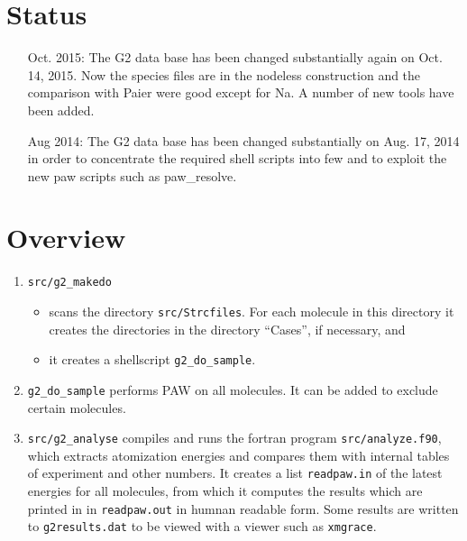 \documentclass{book}
\begin{document}
\section*{Status}
\begin{itemize}
\item[Oct. 2015:] The G2 data base has been changed substantially
  again on Oct. 14, 2015. Now the species files are in the nodeless
  construction and the comparison with Paier were good except for
  Na. A number of new tools have been added.
%
\item[Aug 2014:] The G2 data base has been changed substantially on
  Aug. 17, 2014 in order to concentrate the required shell scripts
  into few and to exploit the new paw scripts such as paw\_resolve.
%
\end{itemize}

\section*{Overview}
\begin{enumerate}
\item \verb+src/g2_makedo+ 
  \begin{itemize}
    \item scans the directory \verb+src/Strcfiles+. For each molecule
       in this directory it creates the directories in the directory
       ``Cases'', if necessary, and 
    \item  it creates a shellscript \verb|g2_do_sample|. 
  \end{itemize}
%
\item \verb|g2_do_sample| performs PAW on all molecules. It can be
  added to exclude certain molecules.
\item \verb+src/g2_analyse+ compiles and runs the fortran program
  \verb|src/analyze.f90|, which extracts atomization energies and
  compares them with internal tables of experiment and other numbers.
  It creates a list \verb+readpaw.in+ of the latest energies for all
  molecules, from which it computes the results which are printed in
  in \verb|readpaw.out| in humnan readable form. Some results are
  written to \verb+g2results.dat+ to be viewed with a viewer such as
  \verb|xmgrace|.
\end{enumerate}
\end{document}
